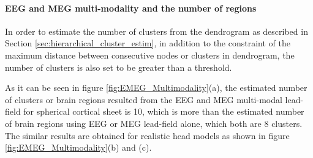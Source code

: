 \paragraph{EEG and MEG multi-modality and the number of regions}
\label{EEG and MEG multimodality and the number of regions}
In order to estimate the number of clusters from the dendrogram as described in Section \ref{sec:hierarchical_cluster_estim}, in addition to the constraint of the maximum distance between consecutive nodes or clusters in dendrogram, the number of clusters is also set to be greater than a threshold.

As it can be seen in figure \ref{fig:EMEG_Multimodality}(a), the estimated number of clusters or brain regions resulted from the EEG and MEG multi-modal lead-field for spherical cortical sheet is 10, which is more than the estimated number of brain regions using EEG or MEG lead-field alone, which both are 8 clusters. %
The similar results are obtained for realistic head models as shown in figure \ref{fig:EMEG_Multimodality}(b) and (c).

